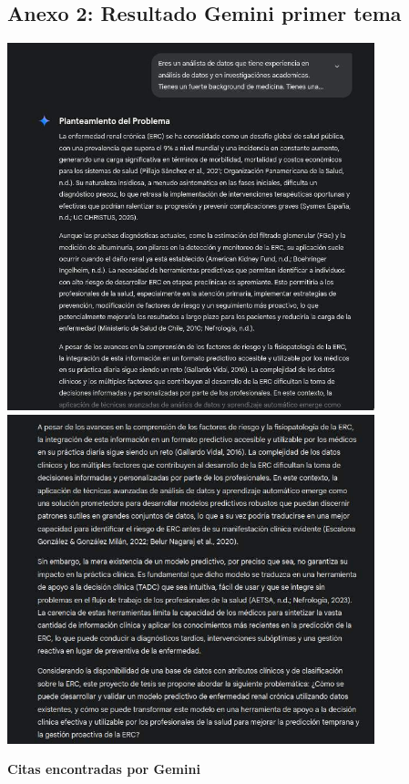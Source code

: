 \documentclass{article}
\begin{document}
\subsection{Anexo 2: Resultado Gemini primer tema}
\begin{center}
\includegraphics[width=0.8\textwidth]{../gemini1.jpg}\\
\includegraphics[width=0.8\textwidth]{../gemini2.jpg}\\
\end{center}
\textbf{Citas encontradas por Gemini}
\end{document}
